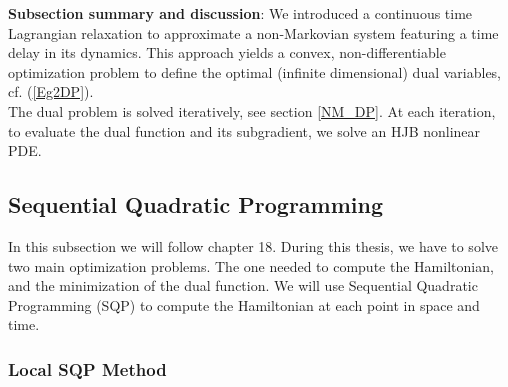 \textbf{Subsection summary and discussion}: We introduced a continuous time Lagrangian relaxation to approximate a non-Markovian system featuring a time delay in its dynamics.  This approach yields a convex, non-differentiable optimization problem to define the optimal  (infinite dimensional) dual variables, cf. (\ref{Eg2DP}).\\
The dual problem is solved iteratively, see section \ref{NM_DP}. At each iteration, to evaluate the dual function and its subgradient, we solve an HJB nonlinear PDE.

\subsection{Sequential Quadratic Programming}

In this subsection we will follow \cite{nocedal2006numerical} chapter 18. During this thesis, we have to solve two main optimization problems. The one needed to compute the Hamiltonian, and the minimization of the dual function. We will use Sequential Quadratic Programming (SQP) to compute the Hamiltonian at each point in space and time.

\subsubsection{Local SQP Method}

